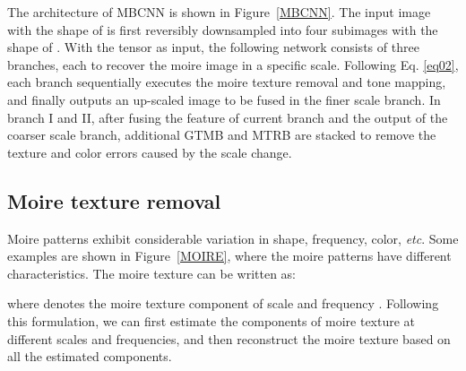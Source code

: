 \documentclass[10pt,twocolumn,letterpaper]{article}
\begin{document}
The architecture of MBCNN is shown in Figure~\ref{MBCNN}. 
The input image  with the shape of  is first reversibly downsampled into four subimages  with the shape of . With the tensor  as input, the following network consists of three branches, each to recover the moire image in a specific scale. 
Following Eq. \ref{eq02}, each branch sequentially executes the moire texture removal and tone mapping, and finally outputs an up-scaled image to be fused in the finer scale branch. 
In branch I and II, after fusing the feature of current branch and the output of the coarser scale branch, additional GTMB and MTRB are stacked to remove the texture and color errors caused by the scale change.


\begin{comment}
Branch I starts with a   layer  to transform  into convolution domain, denoted as . Then block  removes the moire texture components from  and outputs the tensor . 
Next, a  stride   layer  starts the branch II by outputting  from . 
Similarly, the  outputs the  from , and  a  stride   layer  outputs  from  starting the branch III.

In the branch III, the  first removes moire texture components from , then the  and the  are stacked to make a tone mapping outputting the convolution domain representation of restored image . 
At the end, the upsampling decoder , including a  convolution layer and a  pixel shuffle upsampling layer~\cite{espcn}, transforms the  to the restored image  with the shape of . 
After obtaining , we concatenated  and  together and fuse these two tensors as , then took the  to make a global color balance. 
Then, the , ,  and  are sequentially stacked to output the restored image  with the shape of . 
Being similar to the branch II, the branch II adopts the same architecture to fuse  and  together and output the final restored image  with the shape of .
\end{comment}

\subsection{Moire texture removal}
\label{sec3_2}
Moire patterns exhibit considerable variation in shape, frequency, color, \textit{etc}. Some examples are shown in Figure~\ref{MOIRE}, where the moire patterns have different characteristics. The moire texture can be written as:

where  denotes the moire texture component of scale  and frequency . 
Following this formulation, we can first estimate the components of moire texture at different scales and frequencies, and then reconstruct the moire texture based on all the estimated components.
\end{document}
